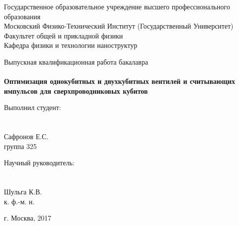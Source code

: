 \documentclass[12pt, twoside]{report}
\numberwithin{equation}{section}
\numberwithin{figure}{section}
\begin{document}
\newif\ifdraft
\drafttrue

\ifdraft

\begin{titlepage}
\begin{center}
Государственное образовательное учреждение высшего профессионального образования\\
Московский Физико-Технический Институт (Государственный Университет)\\
Факультет общей и прикладной физики\\
Кафедра физики и технологии наноструктур\\
\end{center}

\vspace{5cm}

\begin{center}

Выпускная квалификационная работа бакалавра\\~\\
\Large \textbf{Оптимизация однокубитных и двухкубитных вентилей и считывающих импульсов для сверхпроводниковых кубитов}
\end{center}

\vspace{4cm}
\begin{center}
\begin{minipage}{0.45\textwidth}
\begin{center}
Выполнил студент:\\~\\~\\
Сафронов Е.С.\\
группа 325
\end{center}
\end{minipage}
\begin{minipage}{0.45\textwidth}
\begin{center}
Научный руководитель:\\~\\~\\
Шульга К.В.\\
к. ф.-м. н.
\end{center}
\end{minipage}
\end{center}

\vspace{\fill}

\begin{center}
г. Москва, 2017
\end{center}
\end{titlepage}
\end{document}
